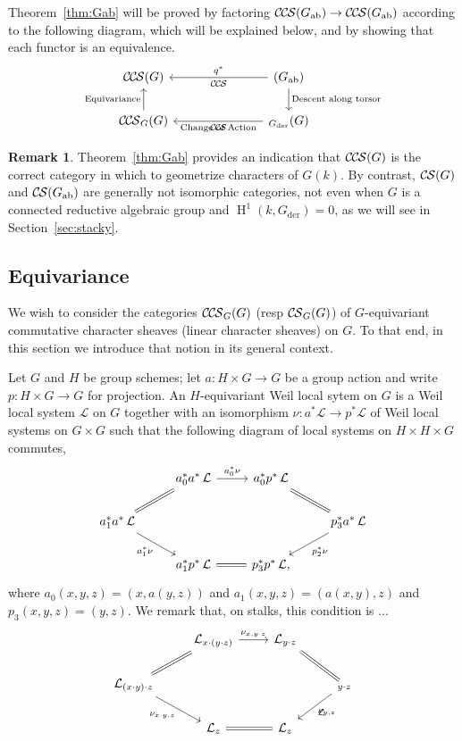 \documentclass[10pt]{amsart}
\theoremstyle{plain}
\theoremstyle{definition}
\newtheorem{remark}[theorem]{Remark}
\newcommand{\Fq}{k}
\DeclareMathOperator{\Hh}{H}
\newcommand{\der}{_{\operatorname{der}}}
\newcommand{\ab}{_{\operatorname{ab}}}
\newcommand{\cs}[1]{{\mathcal{#1}}}
\newcommand{\CS}{{\mathcal{C\hskip-0.8pt S}}}
\newcommand{\CCS}{{\mathcal{C\hskip-.8pt C\hskip-0.8pt S}}}
\begin{document}
Theorem~\ref{thm:Gab} will be proved by factoring $\CCS(G\ab) \to \CCS(G\ab)$ according to the following diagram, which will be explained below, 
and by showing that each functor is an equivalence.
\[
\begin{tikzcd}
 \CCS(G)  &&& \arrow{lll}[swap]{q^*}  \CCS(G\ab) \arrow{d}{\text{Descent along torsor}} \\
\CCS_G(G)  \arrow{u}{\text{Equivariance}} &&& \arrow{lll}{\text{Change of Action}} \CCS_{G\der}(G) 
\end{tikzcd}
\]

\begin{remark}
Theorem~\ref{thm:Gab} provides an indication that $\CCS(G)$ is the correct category in which to geometrize characters of $G(\Fq)$. 
By contrast, $\CS(G)$ and $\CS(G\ab)$ are generally not isomorphic categories, not even when $G$ is a connected reductive algebraic group and $\Hh^1(\Fq,G\der)=0$, as we will see in Section~\ref{sec:stacky}.
\end{remark}

\subsection{Equivariance}

We wish to consider the categories $\CCS_G(G)$ (resp $\CS_G(G)$) of $G$-equivariant commutative character sheaves (linear character sheaves) on $G$. To that end, in this section we introduce that notion in its general context.

Let $G$ and $H$ be group schemes; let $a : H \times G\to G$ be a group action and write $p : H\times G \to G$ for projection. 
An $H$-equivariant Weil local sytem on $G$ is a Weil local system $\cs{L}$ on $G$ together with an isomorphism  $\nu : a^*\cs{L} \to p^*\cs{L}$ of Weil local systems on $G\times G$ such that the following diagram of local systems on $H\times H\times G$ commutes,
\[
\begin{tikzcd}
\ &  a_0^*  a^*\, \mathcal{L} \arrow{r}{a_0^*\nu} & a_0^* p^*\, \mathcal{L} & \\
a_1^* a^*\, \mathcal{L} \arrow{dr}[swap]{a_1^*\nu} \arrow[equal]{ur} &&& \arrow[equal]{ul}  \arrow{dl}{p_2^*\nu} p_3^* a^*\, \mathcal{L} \\
& a_1^* p^*\, \mathcal{L} \arrow[equal]{r} & p_3^* p^*\, \mathcal{L}, & 
\end{tikzcd}
\]
where $a_0(x,y,z) = (x,a(y,z))$ and $a_1(x,y,z) = (a(x,y),z)$ and $p_3(x,y,z) = (y,z)$.
We remark that, on stalks, this condition is ...
\[
\begin{tikzcd}
\ &  \cs{L}_{x\cdot(y\cdot z)} \arrow{r}{\nu_{x,y\cdot z}} & \cs{L}_{y\cdot z} & \\
\cs{L}_{(x\cdot y)\cdot z} \arrow{dr}[swap]{\nu_{x\cdot y,z}} \arrow[equal]{ur} &&& \arrow[equal]{ul}  \arrow{dl}{\nu_{y,z}} \cs{L}_{y\cdot z} \\
& \cs{L}_z \arrow[equal]{r} & \cs{L}_z & 
\end{tikzcd}
\]
\end{document}
